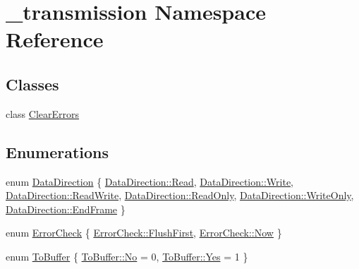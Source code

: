 \hypertarget{namespace__transmission}{}\section{\+\_\+transmission Namespace Reference}
\label{namespace__transmission}
\subsection*{Classes}
\begin{DoxyCompactItemize}
\item 
class \hyperlink{class__transmission_1_1ClearErrors}{Clear\+Errors}
\end{DoxyCompactItemize}
\subsection*{Enumerations}
\begin{DoxyCompactItemize}
\item 
enum \hyperlink{namespace__transmission_a49a33659d7c6abcf7f0180cd7e34fa0e}{Data\+Direction} \{ \newline
\hyperlink{namespace__transmission_a49a33659d7c6abcf7f0180cd7e34fa0ea7a1a5f3e79fdc91edf2f5ead9d66abb4}{Data\+Direction\+::\+Read}, 
\newline
\hyperlink{namespace__transmission_a49a33659d7c6abcf7f0180cd7e34fa0ea1129c0e4d43f2d121652a7302712cff6}{Data\+Direction\+::\+Write}, 
\newline
\hyperlink{namespace__transmission_a49a33659d7c6abcf7f0180cd7e34fa0ea70a2a84088d405a2e3f1e3accaa16723}{Data\+Direction\+::\+Read\+Write}, 
\newline
\hyperlink{namespace__transmission_a49a33659d7c6abcf7f0180cd7e34fa0ea131fb182a881796e7606ed6da27f1197}{Data\+Direction\+::\+Read\+Only}, 
\newline
\hyperlink{namespace__transmission_a49a33659d7c6abcf7f0180cd7e34fa0ea53dfe5089ae9e65887cb0215cb0098f5}{Data\+Direction\+::\+Write\+Only}, 
\newline
\hyperlink{namespace__transmission_a49a33659d7c6abcf7f0180cd7e34fa0ea6c1645a468ccfce0975fc95587b97adf}{Data\+Direction\+::\+End\+Frame}
 \}
\item 
enum \hyperlink{namespace__transmission_aea6508744dac6029815eb3aac4affda8}{Error\+Check} \{ \newline
\hyperlink{namespace__transmission_aea6508744dac6029815eb3aac4affda8ab36c3bebcfd0fff1a1761099e4d30d10}{Error\+Check\+::\+Flush\+First}, 
\newline
\hyperlink{namespace__transmission_aea6508744dac6029815eb3aac4affda8a1e1cc9bdeb2f29f5480106aec7e9bc48}{Error\+Check\+::\+Now}
 \}
\item 
enum \hyperlink{namespace__transmission_a43fedd4787676a3bbd1a35dbfa138f06}{To\+Buffer} \{ \newline
\hyperlink{namespace__transmission_a43fedd4787676a3bbd1a35dbfa138f06abafd7322c6e97d25b6299b5d6fe8920b}{To\+Buffer\+::\+No} = 0, 
\newline
\hyperlink{namespace__transmission_a43fedd4787676a3bbd1a35dbfa138f06a93cba07454f06a4a960172bbd6e2a435}{To\+Buffer\+::\+Yes} = 1
 \}
\end{DoxyCompactItemize}
